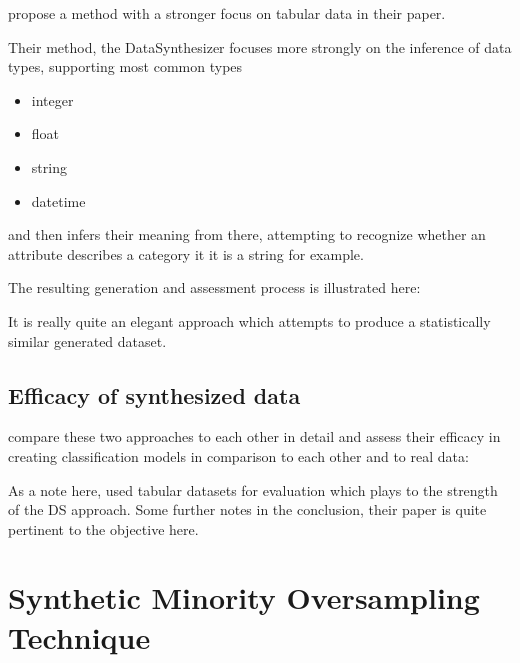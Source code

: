 \cite{ping2017datasynthesizer} propose a method with a stronger focus on tabular data in their paper.

Their method, the DataSynthesizer focuses more strongly on the inference of data types, supporting most common types

\begin{itemize}
	\item integer
	\item float
	\item string
	\item datetime
\end{itemize} 

and then infers their meaning from there, attempting to recognize whether an attribute describes a category it it is a string for example.

\pagebreak

The resulting generation and assessment process is illustrated here:


It is really quite an elegant approach which attempts to produce a statistically similar generated dataset.

\clearpage

\subsection{Efficacy of synthesized data}

\label{subsection:efficacy}

\cite{ares_utility} compare these two approaches to each other in detail and assess their efficacy in creating classification models in comparison to each other and to real data:


As a note here, \cite{ares_utility} used tabular datasets for evaluation which plays to the strength of the \ac{DS} approach. Some further notes in the conclusion, their paper is quite pertinent to the objective here.

\pagebreak

\section{Synthetic Minority Oversampling Technique}
\label{section:smote}

